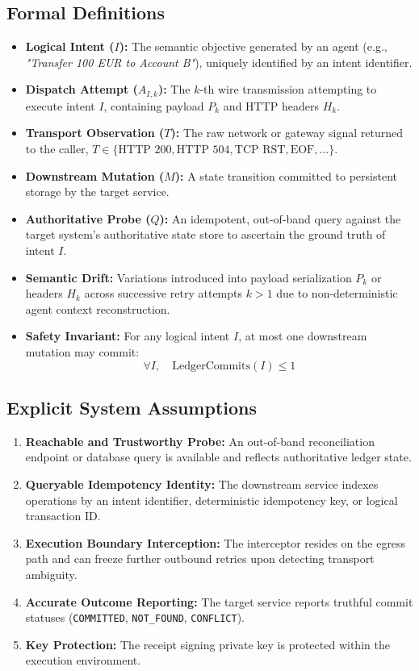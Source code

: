 \documentclass[10pt,journal,compsoc]{IEEEtran}
\begin{document}
\subsection{Formal Definitions}
\begin{itemize}
    \item \textbf{Logical Intent ($I$):} The semantic objective generated by an agent (e.g., \textit{"Transfer 100 EUR to Account B"}), uniquely identified by an intent identifier.
    \item \textbf{Dispatch Attempt ($A_{I, k}$):} The $k$-th wire transmission attempting to execute intent $I$, containing payload $P_k$ and HTTP headers $H_k$.
    \item \textbf{Transport Observation ($T$):} The raw network or gateway signal returned to the caller, $T \in \{\text{HTTP 200}, \text{HTTP 504}, \text{TCP RST}, \text{EOF}, \dots\}$.
    \item \textbf{Downstream Mutation ($M$):} A state transition committed to persistent storage by the target service.
    \item \textbf{Authoritative Probe ($Q$):} An idempotent, out-of-band query against the target system's authoritative state store to ascertain the ground truth of intent $I$.
    \item \textbf{Semantic Drift:} Variations introduced into payload serialization $P_k$ or headers $H_k$ across successive retry attempts $k > 1$ due to non-deterministic agent context reconstruction.
    \item \textbf{Safety Invariant:} For any logical intent $I$, at most one downstream mutation may commit:
    \begin{equation}
    \forall I, \quad \text{LedgerCommits}(I) \le 1
    \end{equation}
\end{itemize}

\subsection{Explicit System Assumptions}
\begin{enumerate}
    \item \textbf{Reachable and Trustworthy Probe:} An out-of-band reconciliation endpoint or database query is available and reflects authoritative ledger state.
    \item \textbf{Queryable Idempotency Identity:} The downstream service indexes operations by an intent identifier, deterministic idempotency key, or logical transaction ID.
    \item \textbf{Execution Boundary Interception:} The interceptor resides on the egress path and can freeze further outbound retries upon detecting transport ambiguity.
    \item \textbf{Accurate Outcome Reporting:} The target service reports truthful commit statuses (\texttt{COMMITTED}, \texttt{NOT\_FOUND}, \texttt{CONFLICT}).
    \item \textbf{Key Protection:} The receipt signing private key is protected within the execution environment.
\end{enumerate}
\end{document}
